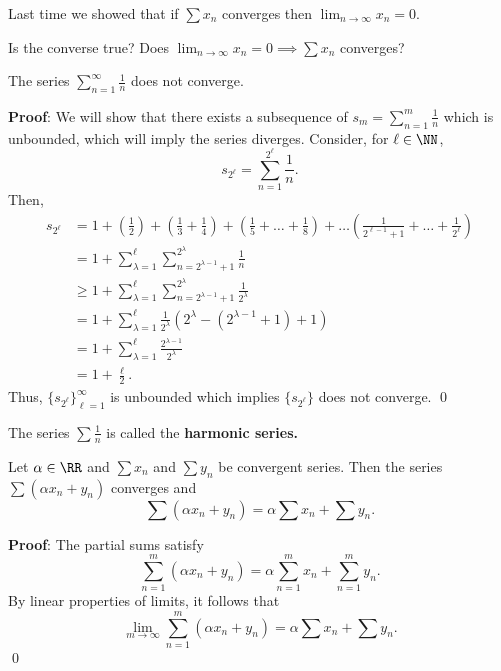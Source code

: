 
\begin{recall}
Last time we showed that if $\sum x_n$ converges then $\lim_{n\to \infty} x_n = 0$.
\end{recall}

\begin{question}
Is the converse true? Does $\lim_{n\to \infty} x_n = 0 \implies \sum x_n$ converges?
\end{question}

\begin{theorem}
The series $\sum_{n=1}^\infty \frac{1}{n}$ does not converge.
\end{theorem}
\textbf{Proof}: We will show that there exists a subsequence of $s_m = \sum_{n=1}^m \frac{1}{n}$ which is unbounded, which will imply the series diverges. Consider, for $\ell \in \NN$, 
\[
s_{2^\ell} = \sum_{n=1}^{2^\ell} \frac{1}{n}.
\]
Then,
\begin{align*}
    s_{2^\ell} &= 1+\left(\frac{1}{2}\right) + \left(\frac{1}{3} + \frac{1}{4}\right) + \left(\frac{1}{5} + \dots + \frac{1}{8} \right)  + \dots \left(\frac{1}{2^{\ell-1}+1} + \dots + \frac{1}{2^\ell}\right) \\
    &= 1 + \sum_{\lambda = 1}^\ell \sum_{n=2^{\lambda-1}+1}^{2^\lambda} \frac{1}{n} \\
    &\geq 1 + \sum_{\lambda = 1}^\ell \sum_{n=2^{\lambda-1}+1}^{2^\lambda} \frac{1}{2^\lambda} \\
    &= 1 + \sum_{\lambda = 1}^\ell \frac{1}{2^\lambda}(2^\lambda - (2^{\lambda-1}+1)+1) \\
    &= 1 + \sum_{\lambda = 1}^\ell \frac{2^{\lambda-1}}{2^\lambda} \\
    &= 1 + \frac{\ell}{2}.
\end{align*}
Thus, $\{s_{2^\ell}\}_{\ell=1}^\infty$ is unbounded which implies $\{s_{2^\ell}\}$ does not converge. \qed 

\begin{remark}
The series $\sum \frac{1}{n}$ is called the \textbf{harmonic series.}
\end{remark}

\begin{theorem}
Let $\alpha \in \RR$ and $\sum x_n$ and $\sum y_n$ be convergent series. Then the series $\sum (\alpha x_n + y_n)$ converges and 
\[
\sum (\alpha x_n + y_n) = \alpha \sum x_n + \sum y_n.
\]
\end{theorem}
\textbf{Proof}: The partial sums satisfy
\[
\sum_{n=1}^m (\alpha x_n + y_n) = \alpha \sum_{n=1}^m x_n + \sum_{n=1}^m y_n.
\]
By linear properties of limits, it follows that 
\[
\lim_{m\to \infty} \sum_{n=1}^m (\alpha x_n +y_n) = \alpha \sum x_n + \sum y_n.
\] \qed 

